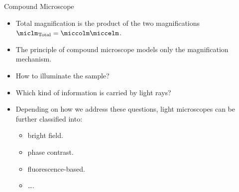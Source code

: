 \begin{frame}{Compound Microscope}
	\begin{itemize}
		\setlength\itemsep{0.4cm}
		\item<1-> Total magnification is the product of the two magnifications $\miclm_{\text{Total}} = \miccolm \miccelm$.
		\item<2-> The principle of compound microscope models only the magnification mechanism.
		\item<3-> How to illuminate the sample?
		\item<4-> Which kind of information is carried by light rays?
		\item<5-> Depending on how we address these questions, light microscopes can be further classified into:
		      \begin{itemize}
			      \item<2-> bright field.
			      \item<5-> phase contrast.
			      \item<6-> fluorescence-based.
			      \item<7-> \dots.
		      \end{itemize}
	\end{itemize}
\end{frame}
